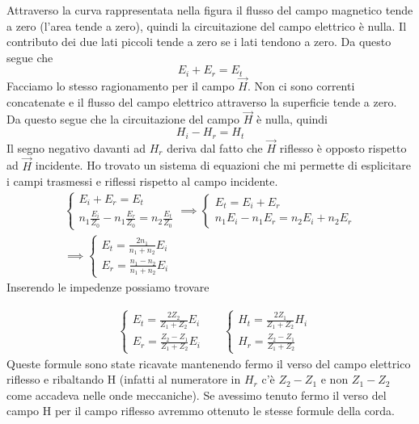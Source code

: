 Attraverso la curva rappresentata nella figura il flusso del campo magnetico tende a zero (l'area tende a zero), quindi la circuitazione del campo elettrico è nulla. Il contributo dei due lati piccoli tende a zero se i lati tendono a zero. Da questo segue che
\begin{equation}
	E_i + E_r = E_t
\end{equation}
Facciamo lo stesso ragionamento per il campo \(\vec{H}\). Non ci sono correnti concatenate e il flusso del campo elettrico attraverso la superficie tende a zero. Da questo segue che la circuitazione del campo \(\vec{H}\) è nulla, quindi
\begin{equation}
	H_i - H_r = H_t
\end{equation}
Il segno negativo davanti ad \(H_r\) deriva dal fatto che \(\vec{H}\) riflesso è opposto rispetto ad \(\vec{H}\) incidente.
Ho trovato un sistema di equazioni che mi permette di esplicitare i campi trasmessi e riflessi rispetto al campo incidente.
\begin{gather}
	\begin{cases}
		E_i +E_r = E_t\\
		n_1 \frac{E_i}{Z_0} - n_1 \frac{E_r}{Z_0} = n_2 \frac{E_t}{Z_0}
	\end{cases}
	\implies 
	\begin{cases}
		E_t = E_i + E_r\\
		n_1 E_i - n_1 E_r = n_2 E_i + n_2 E_r
	\end{cases}\\
	\implies 
	\begin{cases}
		E_t = \frac{2n_1}{n_1 + n_2} E_i\\
		E_r = \frac{n_1 - n_2}{n_1 + n_2} E_i
	\end{cases}
\end{gather}
Inserendo le impedenze possiamo trovare
\begin{formula}
	\begin{align}
		&
		\begin{cases}
			E_t = \frac{2 Z_2}{Z_1 + Z_2} E_i\\
			E_r = \frac{Z_2 -Z_1}{Z_1 + Z_2} E_i
		\end{cases}
		&
		&
		\begin{cases}
			H_t = \frac{2 Z_1}{Z_1 + Z_2}H_i\\
			H_r = \frac{Z_2 - Z_1}{Z_1 + Z_2}
		\end{cases}
	\end{align}
	Queste formule sono state ricavate mantenendo fermo il verso del campo elettrico riflesso e ribaltando H (infatti al numeratore in \(H_r\) c'è \(Z_2 - Z_1\) e non \(Z_1 - Z_2\) come accadeva nelle onde meccaniche). Se avessimo tenuto fermo il verso del campo H per il campo riflesso avremmo ottenuto le stesse formule della corda.
\end{formula}

